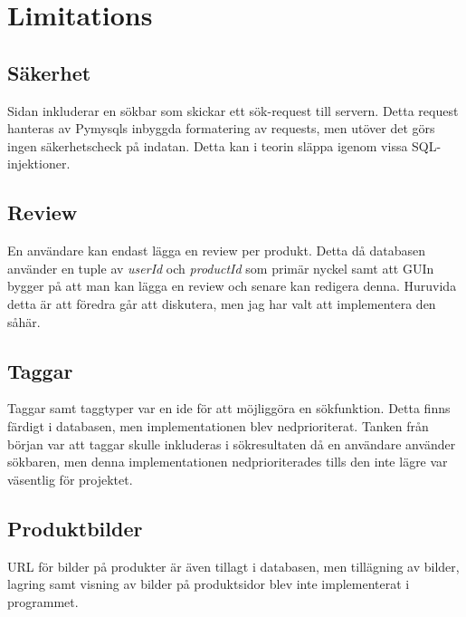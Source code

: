 \documentclass[a4paper]{article}
\begin{document}
\section{Limitations}
\subsection{Säkerhet}
Sidan inkluderar en sökbar som skickar ett sök-request till servern. Detta request hanteras av Pymysqls inbyggda formatering av requests, men utöver det görs ingen säkerhetscheck på indatan. Detta kan i teorin släppa igenom vissa SQL-injektioner.
%
\subsection{Review}
En användare kan endast lägga en review per produkt. Detta då databasen använder en tuple av \textit{userId} och \textit{productId} som primär nyckel samt att GUIn bygger på att man kan lägga en review och senare kan redigera denna. Huruvida detta är att föredra går att diskutera, men jag har valt att implementera den såhär.
%
\subsection{Taggar}
Taggar samt taggtyper var en ide för att möjliggöra en sökfunktion. Detta finns färdigt i databasen, men implementationen blev nedprioriterat. Tanken från början var att taggar skulle inkluderas i sökresultaten då en användare använder sökbaren, men denna implementationen nedprioriterades tills den inte lägre var väsentlig för projektet.
%
\subsection{Produktbilder}
URL för bilder på produkter är även tillagt i databasen, men tillägning av bilder, lagring samt visning av bilder på produktsidor blev inte implementerat i programmet.
%
\end{document}

